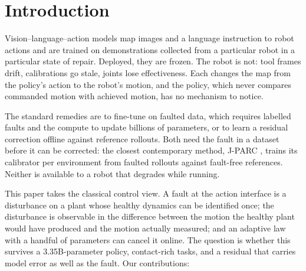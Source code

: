\documentclass{article}
\begin{document}
\section{Introduction}

Vision--language--action models map images and a language instruction to robot actions and
are trained on demonstrations collected from a particular robot in a particular state of
repair. Deployed, they are frozen. The robot is not: tool frames drift, calibrations go
stale, joints lose effectiveness. Each changes the map from the policy's action to the
robot's motion, and the policy, which never compares commanded motion with achieved
motion, has no mechanism to notice.

The standard remedies are to fine-tune on faulted data, which requires labelled faults and
the compute to update billions of parameters, or to learn a residual correction offline
against reference rollouts. Both need the fault in a dataset before it can be corrected: the closest contemporary
method, J-PARC \citep{jparc2026}, trains its calibrator per environment from faulted
rollouts against fault-free references. Neither is available to a robot that degrades
while running.

This paper takes the classical control view. A fault at the action interface is a
disturbance on a plant whose healthy dynamics can be identified once; the disturbance is
observable in the difference between the motion the healthy plant would have produced and
the motion actually measured; and an adaptive law with a handful of parameters can cancel
it online. The question is whether this survives a 3.35B-parameter policy, contact-rich
tasks, and a residual that carries model error as well as the fault. Our contributions:
\end{document}
